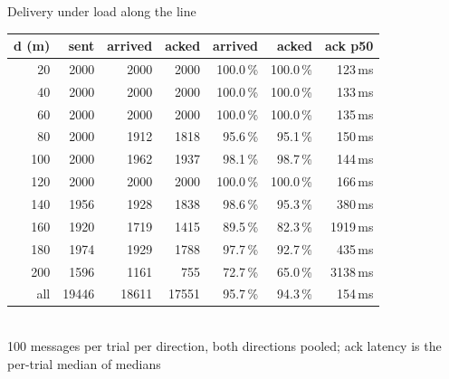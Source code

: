 \begin{frame}{Delivery under load along the line}
    \centering
    \small
    \begin{tabular}{@{}rrrrrrr@{}}
        \toprule
        \textbf{d (m)} & \textbf{sent} & \textbf{arrived} & \textbf{acked} & \textbf{arrived} & \textbf{acked} & \textbf{ack p50} \\
        \midrule
         20 & 2000 & 2000 & 2000 & 100.0\,\% & 100.0\,\% &  123\,ms \\
         40 & 2000 & 2000 & 2000 & 100.0\,\% & 100.0\,\% &  133\,ms \\
         60 & 2000 & 2000 & 2000 & 100.0\,\% & 100.0\,\% &  135\,ms \\
         80 & 2000 & 1912 & 1818 &  95.6\,\% &  95.1\,\% &  150\,ms \\
        100 & 2000 & 1962 & 1937 &  98.1\,\% &  98.7\,\% &  144\,ms \\
        120 & 2000 & 2000 & 2000 & 100.0\,\% & 100.0\,\% &  166\,ms \\
        140 & 1956 & 1928 & 1838 &  98.6\,\% &  95.3\,\% &  380\,ms \\
        160 & 1920 & 1719 & 1415 &  89.5\,\% &  82.3\,\% & 1919\,ms \\
        180 & 1974 & 1929 & 1788 &  97.7\,\% &  92.7\,\% &  435\,ms \\
        200 & 1596 & 1161 &  755 &  72.7\,\% &  65.0\,\% & 3138\,ms \\
        \midrule
        all & 19446 & 18611 & 17551 & 95.7\,\% & 94.3\,\% & 154\,ms \\
        \bottomrule
    \end{tabular}\\[1ex]
    {\footnotesize 100 messages per trial per direction, both directions pooled; ack latency is the per-trial median of medians}
\end{frame}



